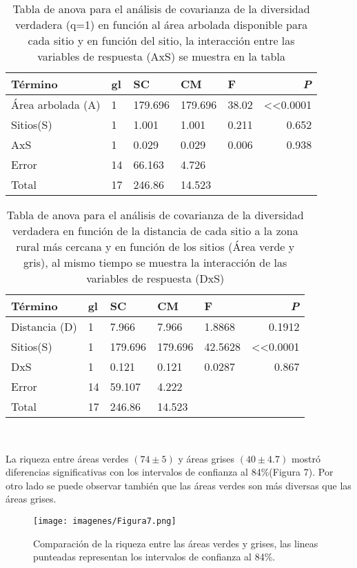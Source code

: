 \documentclass[letterpaper,12pt]{article}
\begin{document}
{\footnotesize
\begin{longtable}[c] {lllllr} 
\caption[ANCOVA para la diversidad verdadera (q=1) en relación al sitio y área arbolada.]{Tabla de anova para el análisis de covarianza de la diversidad verdadera (q=1) en función al área arbolada disponible para cada sitio y en función del sitio, la interacción entre las variables de respuesta (AxS) se muestra en la tabla} \\
 Término & gl & SC & CM & F & \textit{P} \\ \midrule
Área arbolada (A) &1& 179.696 & 179.696 & 38.02 & <<0.0001 \\
Sitios(S) & 1 & 1.001  & 1.001 & 0.211 & 0.652 \\
AxS &1& 0.029 & 0.029 & 0.006 & 0.938 \\ 
Error &14& 66.163 & 4.726  \\
Total &17& 246.86 & 14.523 \\ \bottomrule 
\end{longtable}
}
\pagebreak
{\footnotesize
\begin{longtable}[c] {lllllr} 
\caption[ANCOVA para la diversidad verdadera (q=1) en relación al sitio y la distancia.]{Tabla de anova para el análisis de covarianza de la diversidad verdadera  en función  de la  distancia de cada sitio a la zona rural más cercana y en función de los sitios (Área verde y gris), al mismo tiempo se muestra la interacción de las variables de respuesta (DxS)} \\
 Término &gl& SC & CM & F & \textit{P} \\ \midrule
Distancia (D) &1& 7.966 & 7.966 & 1.8868 & 0.1912  \\
Sitios(S)  &1& 179.696 & 179.696 &42.5628& <<0.0001 \\
DxS &1& 0.121 & 0.121 & 0.0287 & 0.867  \\ 
Error & 14 & 59.107 & 4.222 \\
Total &17& 246.86 & 14.523  \\ \bottomrule 
\end{longtable}
} \\[5cm]

\newpage

La riqueza entre áreas verdes ${(74\pm5)}$ y áreas grises ${(40\pm4.7)}$ mostró diferencias significativas con los intervalos de confianza al 84\%(Figura 7). Por otro lado se puede observar también que las áreas verdes son más diversas que las áreas grises. \\

\begin{center}
\begin{figure}[H]
\texttt{[image: imagenes/Figura7.png]}\\
\caption[Riqueza e intervalos de confianza al 84\%]{Comparación de la riqueza entre las áreas verdes y grises, las lineas punteadas representan los intervalos de confianza al 84\%.}
\end{figure}
\end{center}
\end{document}
